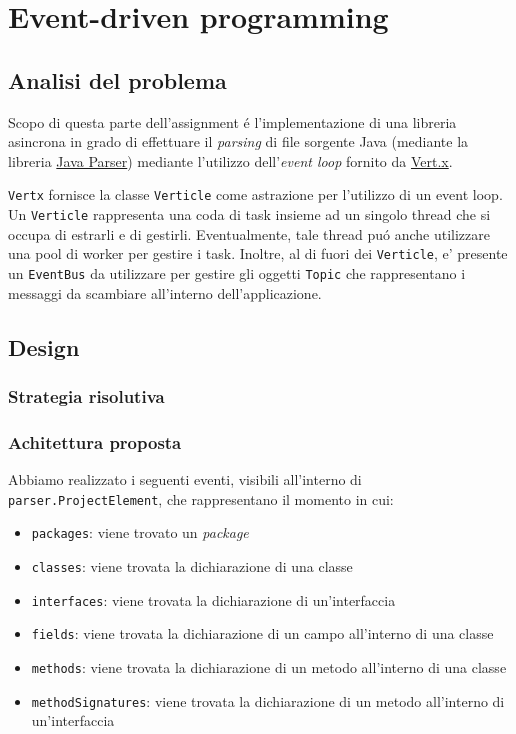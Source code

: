 \documentclass[report]{subfiles}
\begin{document}
	\section{Event-driven programming}
	\subsection{Analisi del problema}
	Scopo di questa parte dell'assignment \'e l'implementazione di una libreria asincrona in grado di effettuare il \emph{parsing} di file sorgente Java (mediante la libreria \href{https://javaparser.org/}{Java Parser}) mediante l'utilizzo dell'\emph{event loop} fornito da \href{https://vertx.io/}{Vert.x}.
	
	\texttt{Vertx} fornisce la classe \texttt{Verticle} come astrazione per l'utilizzo di un event loop. Un \texttt{Verticle} rappresenta una coda di task insieme ad un singolo thread che si occupa di estrarli e di gestirli. Eventualmente, tale thread pu\'o anche utilizzare una pool di worker per gestire i task. Inoltre, al di fuori dei \texttt{Verticle}, e' presente un \texttt{EventBus} da utilizzare per gestire gli oggetti \texttt{Topic} che rappresentano i messaggi da scambiare all'interno dell'applicazione.
	
	\subsection{Design}
	\subsubsection{Strategia risolutiva}
	\subsubsection{Achitettura proposta}
	Abbiamo realizzato i seguenti eventi, visibili all'interno di \texttt{parser.ProjectElement}, che rappresentano il momento in cui:
	\begin{itemize}
		\item \texttt{packages}: viene trovato un \emph{package}
		\item \texttt{classes}: viene trovata la dichiarazione di una classe
		\item \texttt{interfaces}: viene trovata la dichiarazione di un'interfaccia
		\item \texttt{fields}: viene trovata la dichiarazione di un campo all'interno di una classe
		\item \texttt{methods}: viene trovata la dichiarazione di un metodo all'interno di una classe
		\item \texttt{methodSignatures}: viene trovata la dichiarazione di un metodo all'interno di un'interfaccia
	\end{itemize}
	
\end{document}
